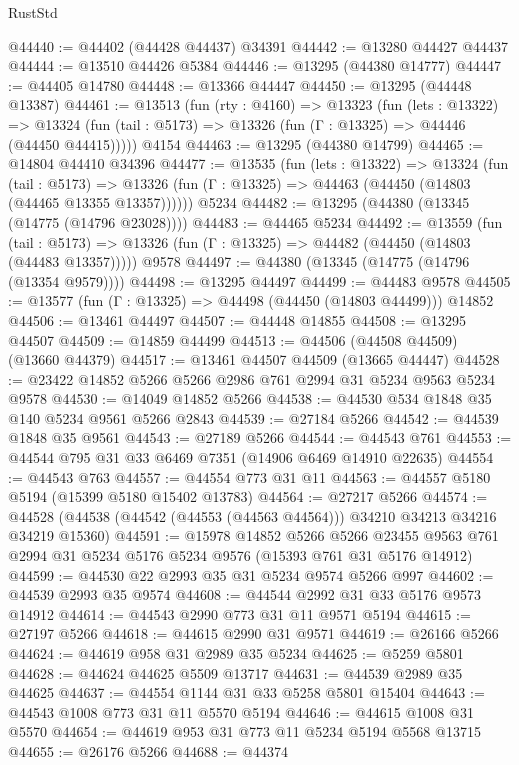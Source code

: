 \begin{lexlean}{RustStd}
\begin{coremodule}
@44440 := @44402 (@44428 @44437) @34391
@44442 := @13280 @44427 @44437
@44444 := @13510 @44426 @5384
@44446 := @13295 (@44380 @14777)
@44447 := @44405 @14780
@44448 := @13366 @44447
@44450 := @13295 (@44448 @13387)
@44461 := @13513
    (fun (rty : @4160) =>
    @13323
      (fun (lets : @13322) =>
      @13324 (fun (tail : @5173) => @13326 (fun (Γ : @13325) => @44446 (@44450 @44415)))))
    @4154
@44463 := @13295 (@44380 @14799)
@44465 := @14804 @44410 @34396
@44477 := @13535
    (fun (lets : @13322) =>
    @13324
      (fun (tail : @5173) =>
      @13326 (fun (Γ : @13325) => @44463 (@44450 (@14803 (@44465 @13355 @13357))))))
    @5234
@44482 := @13295 (@44380 (@13345 (@14775 (@14796 @23028))))
@44483 := @44465 @5234
@44492 := @13559
    (fun (tail : @5173) => @13326 (fun (Γ : @13325) => @44482 (@44450 (@14803 (@44483 @13357)))))
    @9578
@44497 := @44380 (@13345 (@14775 (@14796 (@13354 @9579))))
@44498 := @13295 @44497
@44499 := @44483 @9578
@44505 := @13577 (fun (Γ : @13325) => @44498 (@44450 (@14803 @44499))) @14852
@44506 := @13461 @44497
@44507 := @44448 @14855
@44508 := @13295 @44507
@44509 := @14859 @44499
@44513 := @44506 (@44508 @44509) (@13660 @44379)
@44517 := @13461 @44507 @44509 (@13665 @44447)
@44528 := @23422 @14852 @5266 @5266 @2986 @761 @2994 @31 @5234 @9563 @5234 @9578
@44530 := @14049 @14852 @5266
@44538 := @44530 @534 @1848 @35 @140 @5234 @9561 @5266 @2843
@44539 := @27184 @5266
@44542 := @44539 @1848 @35 @9561
@44543 := @27189 @5266
@44544 := @44543 @761
@44553 := @44544 @795 @31 @33 @6469 @7351 (@14906 @6469 @14910 @22635)
@44554 := @44543 @763
@44557 := @44554 @773 @31 @11
@44563 := @44557 @5180 @5194 (@15399 @5180 @15402 @13783)
@44564 := @27217 @5266
@44574 := @44528 (@44538 (@44542 (@44553 (@44563 @44564))) @34210 @34213 @34216 @34219 @15360)
@44591 := @15978
    @14852
    @5266
    @5266
    @23455
    @9563
    @761
    @2994
    @31
    @5234
    @5176
    @5234
    @9576
    (@15393 @761 @31 @5176 @14912)
@44599 := @44530 @22 @2993 @35 @31 @5234 @9574 @5266 @997
@44602 := @44539 @2993 @35 @9574
@44608 := @44544 @2992 @31 @33 @5176 @9573 @14912
@44614 := @44543 @2990 @773 @31 @11 @9571 @5194
@44615 := @27197 @5266
@44618 := @44615 @2990 @31 @9571
@44619 := @26166 @5266
@44624 := @44619 @958 @31 @2989 @35 @5234
@44625 := @5259 @5801
@44628 := @44624 @44625 @5509 @13717
@44631 := @44539 @2989 @35 @44625
@44637 := @44554 @1144 @31 @33 @5258 @5801 @15404
@44643 := @44543 @1008 @773 @31 @11 @5570 @5194
@44646 := @44615 @1008 @31 @5570
@44654 := @44619 @953 @31 @773 @11 @5234 @5194 @5568 @13715
@44655 := @26176 @5266
@44688 := @44374

\end{coremodule}
\end{lexlean}
